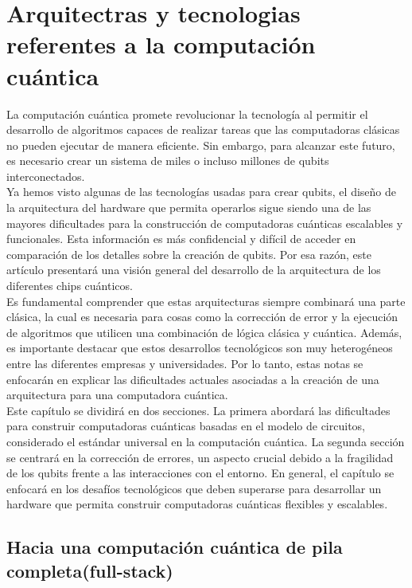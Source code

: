 \section{Arquitectras y tecnologias referentes a la computación cuántica}

La computación cuántica promete revolucionar la tecnología al permitir el desarrollo de algoritmos capaces de realizar tareas que las computadoras clásicas no pueden ejecutar de manera eficiente. Sin  embargo, para alcanzar este futuro, es necesario crear un sistema de miles o incluso millones de qubits interconectados.\\

Ya hemos visto algunas de las tecnologías usadas para crear qubits, el diseño de la arquitectura del hardware que permita operarlos sigue siendo una de las mayores dificultades para la construcción de computadoras cuánticas escalables y funcionales. Esta información es más confidencial y difícil de acceder en comparación de los detalles sobre la creación de qubits. Por esa razón, este artículo presentará una visión general del desarrollo de la arquitectura de los diferentes chips cuánticos.\\

Es fundamental comprender que estas arquitecturas siempre combinará una parte clásica, la cual es necesaria para cosas como la corrección de error y la ejecución de algoritmos que utilicen una combinación de lógica clásica y cuántica. Además, es importante destacar que estos desarrollos tecnológicos son muy heterogéneos entre las diferentes empresas y universidades. Por lo tanto, estas notas se enfocarán en explicar las dificultades actuales asociadas a la creación de una arquitectura para una computadora cuántica.\\

Este capítulo se dividirá en dos secciones. La primera abordará las dificultades para construir computadoras cuánticas basadas en el modelo de circuitos, considerado el estándar universal en la computación cuántica. La segunda sección se centrará en la corrección de errores, un aspecto crucial debido a la fragilidad de los qubits frente a las interacciones con el entorno. En general, el capítulo se enfocará en los desafíos tecnológicos que deben superarse para desarrollar un hardware que permita construir computadoras cuánticas flexibles y escalables.

 
\subsection{Hacia una computación cuántica de pila completa(full-stack)}\label{sec2}

